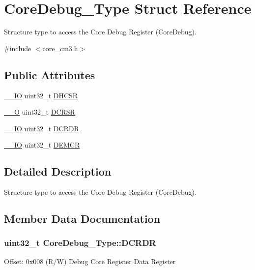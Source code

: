 \hypertarget{structCoreDebug__Type}{}\section{Core\+Debug\+\_\+\+Type Struct Reference}
\label{structCoreDebug__Type}


Structure type to access the Core Debug Register (Core\+Debug).  




{\ttfamily \#include $<$core\+\_\+cm3.\+h$>$}

\subsection*{Public Attributes}
\begin{DoxyCompactItemize}
\item 
\hyperlink{core__sc300_8h_aec43007d9998a0a0e01faede4133d6be}{\+\_\+\+\_\+\+IO} uint32\+\_\+t \hyperlink{structCoreDebug__Type_a25c14c022c73a725a1736e903431095d}{D\+H\+C\+SR}
\item 
\hyperlink{core__sc300_8h_a7e25d9380f9ef903923964322e71f2f6}{\+\_\+\+\_\+O} uint32\+\_\+t \hyperlink{structCoreDebug__Type_afefa84bce7497652353a1b76d405d983}{D\+C\+R\+SR}
\item 
\hyperlink{core__sc300_8h_aec43007d9998a0a0e01faede4133d6be}{\+\_\+\+\_\+\+IO} uint32\+\_\+t \hyperlink{structCoreDebug__Type_ab8f4bb076402b61f7be6308075a789c9}{D\+C\+R\+DR}
\item 
\hyperlink{core__sc300_8h_aec43007d9998a0a0e01faede4133d6be}{\+\_\+\+\_\+\+IO} uint32\+\_\+t \hyperlink{structCoreDebug__Type_a5cdd51dbe3ebb7041880714430edd52d}{D\+E\+M\+CR}
\end{DoxyCompactItemize}


\subsection{Detailed Description}
Structure type to access the Core Debug Register (Core\+Debug). 

\subsection{Member Data Documentation}
\subsubsection[{\texorpdfstring{D\+C\+R\+DR}{DCRDR}}]{ uint32\+\_\+t Core\+Debug\+\_\+\+Type\+::\+D\+C\+R\+DR}\hypertarget{structCoreDebug__Type_ab8f4bb076402b61f7be6308075a789c9}{}\label{structCoreDebug__Type_ab8f4bb076402b61f7be6308075a789c9}
Offset\+: 0x008 (R/W) Debug Core Register Data Register 
